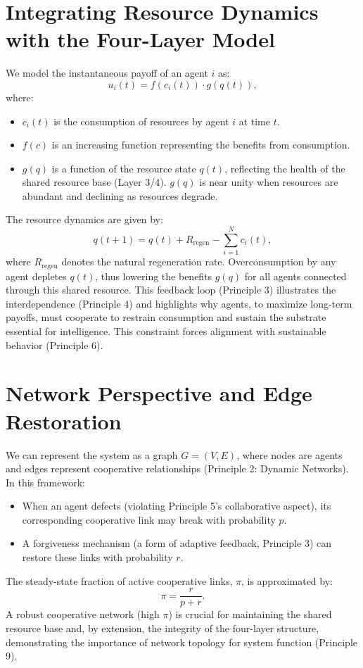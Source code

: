 \documentclass[12pt,openany]{book}
\begin{document}
\section{Integrating Resource Dynamics with the Four-Layer Model}
We model the instantaneous payoff of an agent \( i \) as:
\[
u_i(t) = f(c_i(t)) \cdot g(q(t)),
\]
where:
\begin{itemize}
    \item \( c_i(t) \) is the consumption of resources by agent \( i \) at time \( t \).
    \item \( f(c) \) is an increasing function representing the benefits from consumption.
    \item \( g(q) \) is a function of the resource state \( q(t) \), reflecting the health of the shared resource base (Layer 3/4). \( g(q) \) is near unity when resources are abundant and declining as resources degrade.
\end{itemize}
The resource dynamics are given by:
\[
q(t+1) = q(t) + R_{\text{regen}} - \sum_{i=1}^{N} c_i(t),
\]
where \( R_{\text{regen}} \) denotes the natural regeneration rate. Overconsumption by any agent depletes \( q(t) \), thus lowering the benefits \( g(q) \) for all agents connected through this shared resource. This feedback loop (Principle 3) illustrates the interdependence (Principle 4) and highlights why agents, to maximize long-term payoffs, must cooperate to restrain consumption and sustain the substrate essential for intelligence. This constraint forces alignment with sustainable behavior (Principle 6). %

\section{Network Perspective and Edge Restoration}
We can represent the system as a graph \( G = (V,E) \), where nodes are agents and edges represent cooperative relationships (Principle 2: Dynamic Networks). In this framework:
\begin{itemize}
    \item When an agent defects (violating Principle 5's collaborative aspect), its corresponding cooperative link may break with probability \( p \).
    \item A forgiveness mechanism (a form of adaptive feedback, Principle 3) can restore these links with probability \( r \).
\end{itemize}
The steady-state fraction of active cooperative links, \( \pi \), is approximated by:
\[
\pi = \frac{r}{p + r}.
\]
A robust cooperative network (high \( \pi \)) is crucial for maintaining the shared resource base and, by extension, the integrity of the four-layer structure, demonstrating the importance of network topology for system function (Principle 9). %
\end{document}
